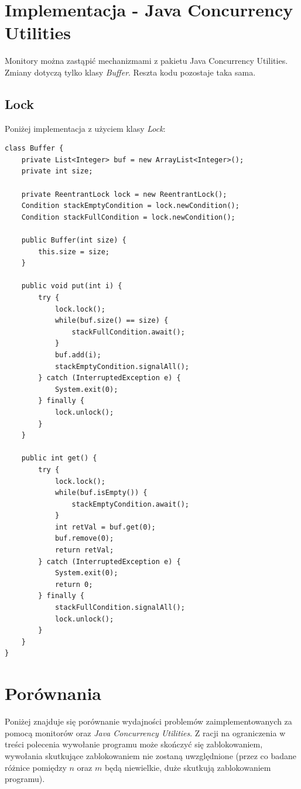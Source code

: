 \documentclass{article}
\begin{document}
\section{Implementacja - Java Concurrency Utilities}

Monitory można zastąpić mechanizmami z pakietu Java Concurrency Utilities. Zmiany dotyczą tylko klasy
\textit{Buffer}. Reszta kodu pozostaje taka sama.

\subsection{Lock}

Poniżej implementacja z użyciem klasy \textit{Lock}:

\begin{verbatim}
class Buffer {
    private List<Integer> buf = new ArrayList<Integer>();
    private int size;

    private ReentrantLock lock = new ReentrantLock();
    Condition stackEmptyCondition = lock.newCondition();
    Condition stackFullCondition = lock.newCondition();

    public Buffer(int size) {
        this.size = size;
    }

    public void put(int i) {
        try {
            lock.lock();
            while(buf.size() == size) {
                stackFullCondition.await();
            }
            buf.add(i);
            stackEmptyCondition.signalAll();
        } catch (InterruptedException e) {
            System.exit(0);
        } finally {
            lock.unlock();
        }
    }

    public int get() {
        try {
            lock.lock();
            while(buf.isEmpty()) {
                stackEmptyCondition.await();
            }
            int retVal = buf.get(0);
            buf.remove(0);
            return retVal;
        } catch (InterruptedException e) {
            System.exit(0);
            return 0;
        } finally {
            stackFullCondition.signalAll();
            lock.unlock();
        }  
    }
}
\end{verbatim}

\section{Porównania}

Poniżej znajduje się porównanie wydajności problemów zaimplementowanych za pomocą monitorów oraz \textit{Java Concurrency Utilities}.
Z racji na ograniczenia w treści polecenia wywołanie programu może skończyć się zablokowaniem, wywołania skutkujące zablokowaniem nie zostaną
uwzględnione (przez co badane różnice pomiędzy $n$ oraz $m$ będą niewielkie, duże skutkują zablokowaniem programu).
\end{document}
